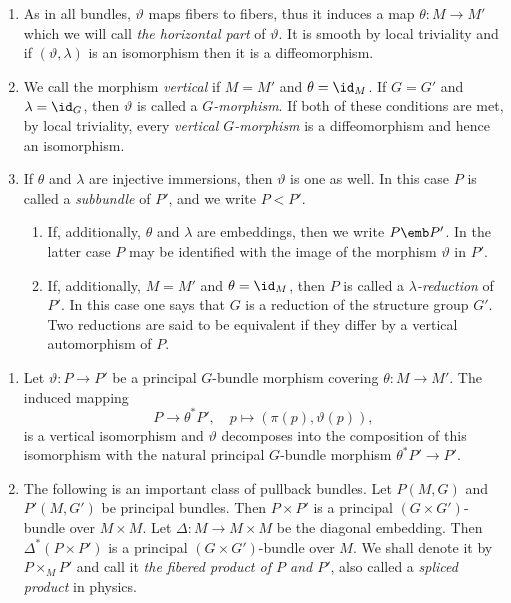 \begin{rem}\label{rem 1.1.8 RS2}
    \begin{enumerate}
        \item As in all bundles, $\vartheta$ maps fibers to fibers, thus it induces a map $\theta:M\to M'$ which we will call \emph{the horizontal part} of $\vartheta$. It is smooth by local triviality and if $(\vartheta,\lambda)$ is an isomorphism then it is a diffeomorphism.
        \item We call the morphism \emph{vertical} if $M=M'$ and $\theta=\id_M$. If $G=G'$ and $\lambda=\id_G$, then $\vartheta$ is called a \emph{$G$-morphism}. If both of these conditions are met, by local triviality, every \emph{vertical $G$-morphism} is a diffeomorphism and hence an isomorphism.
        \item If $\theta$ and $\lambda$ are injective immersions, then $\vartheta$ is one as well. In this case $P$ is called a \emph{subbundle} of $P'$, and we write $P<P'$.
        \begin{enumerate}
            \item If, additionally, $\theta$ and $\lambda$ are embeddings, then we write $P\emb P'$. In the latter case $P$ may be identified with the image of the morphism $\vartheta$ in $P'$.
            \item If, additionally, $M=M'$ and $\theta=\id_M$, then $P$ is called a \emph{$\lambda$-reduction} of $P'$. In this case one says that $G$ is a reduction of the structure group $G'$. Two reductions are said to be equivalent  if they differ by a vertical automorphism of $P$.
        \end{enumerate}
    \end{enumerate}
\end{rem}

\begin{rem}\label{rem 1.1.9 RS2}
    \begin{enumerate}
        \item Let $\vartheta:P\to P'$ be a principal $G$-bundle morphism covering $\theta:M\to M'$. The induced mapping
        \[P\to \theta^\ast P',\quad p\mapsto (\pi(p),\vartheta(p)),\]
        is a vertical isomorphism and $\vartheta$ decomposes into the composition of this isomorphism with the natural principal $G$-bundle morphism $\theta^\ast P'\to P'$.
        \item The following is an important class of pullback bundles. Let $P(M,G)$ and $P'(M,G')$ be principal bundles. Then $P\times P'$ is a principal $(G\times G')$-bundle over $M\times M$. Let $\Delta:M\to M\times M$ be the diagonal embedding. Then $\Delta^\ast(P\times P')$ is a principal $(G\times G')$-bundle over $M$. We shall denote it by $P\times_M P'$ and call it \emph{the fibered product of $P$ and $P'$}, also called a \emph{spliced product} in physics.
    \end{enumerate}
\end{rem}








